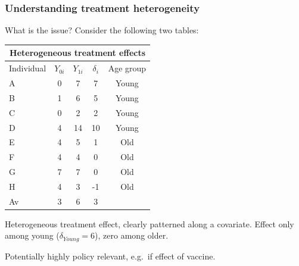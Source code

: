\documentclass[12pt,english,dvipsnames,aspectratio=169,handout]{beamer}\usepackage[]{graphicx}\usepackage[]{xcolor}
\begin{document}
\begin{frame}
  \frametitle{Understanding treatment heterogeneity}
\footnotesize
What is the issue? Consider the following two tables:

\tiny
\begin{table}\centering
\begin{tabular}{lcccc}
\toprule
\multicolumn{5}{c}{Heterogeneous treatment effects}   \\
\midrule
Individual & $Y_{0i}$ &  $Y_{1i}$  & $\delta_i$ & Age group   \\
\midrule
A          &   0    &    7     &   7      & Young        \\
B          &   1    &    6     &   5      & Young        \\
C          &   0    &    2     &   2      & Young        \\
D          &   4    &    14    &   10     & Young        \\
E          &   4    &    5     &   1      & Old        \\
F          &   4    &    4     &   0      & Old        \\
G          &   7    &    7     &   0      & Old        \\
H          &   4    &    3     &   -1     & Old        \\
\hline\hline
Av         &   3    &    6     &   3      &         \\
\bottomrule
\end{tabular}
\end{table}

\footnotesize
Heterogeneous treatment effect, clearly patterned along a covariate. Effect only among young ($\delta_{Young}=6$), zero among older.

Potentially highly policy relevant, e.g.\ if effect of vaccine.

\end{frame}
\end{document}
